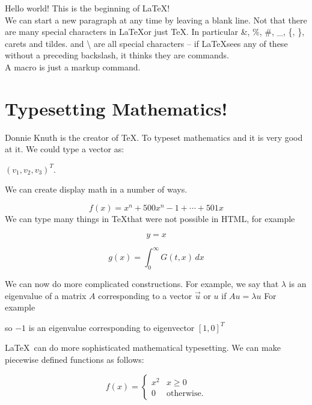 \documentclass[12pt, leqno]{article}
\numberwithin{equation}{section}
\numberwithin{figure}{section}
\begin{document}

Hello world! This is the beginning of \LaTeX! \\

We can start a new paragraph at any time by leaving a blank line. 
Not that there are many special characters in \LaTeX or just \TeX. 
In particular \&, \%, \#, \_, \{, \}, carets and tildes.  and  \textbackslash
are all special characters -- if \LaTeX sees any of these without a preceding backslash, 
it thinks they are commands. \\

A macro is just a markup command. 

\section*{Typesetting Mathematics!}

Donnie Knuth is the creator of \TeX. To typeset mathematics and it is very good at it. 
We could type a vector as: 

$ (v_1, v_2, v_3)^T $.

We can create display math in a number of ways. 

$$ %
f(x) = x^n + 500x^n-1 + \cdots + 501x
$$ 
We can type many things in \TeX that were not possible in HTML, for example 

\begin{equation}
y = x 
\end{equation}  
  
\begin{displaymath}
g(x) = \int_0^\infty G(t,x) \, dx  %
\end{displaymath}  

We can now do more complicated constructions. For example, we say that $\lambda$ is an eigenvalue of a matrix $A$ corresponding to a vector $\vec{u}$ or \(u\) if $Au = \lambda u $ For example 


so $-1$ is an eigenvalue corresponding to eigenvector $[1,0]^T$

\LaTeX\ can do more sophisticated mathematical typesetting. We can make piecewise defined functions as follows: 

\[
f(x) = \begin{cases}
x^2 & x\ge 0 \\ 
0 & \text{otherwise}. 
\end{cases}
\]  
\end{document}
